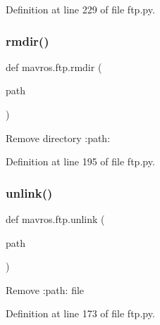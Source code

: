 Definition at line 229 of file ftp.\+py.

\mbox{\label{namespacemavros_1_1ftp_acb46c43e17c6e1a555fb30f0d39aff17}} 
\subsubsection{\texorpdfstring{rmdir()}{rmdir()}}
{\footnotesize\ttfamily def mavros.\+ftp.\+rmdir (\begin{DoxyParamCaption}\item[{}]{path }\end{DoxyParamCaption})}

\begin{DoxyVerb}Remove directory :path:\end{DoxyVerb}
 

Definition at line 195 of file ftp.\+py.

\mbox{\label{namespacemavros_1_1ftp_aa9c32cf7a3fca4b43a45ca103b9e5a7f}} 
\subsubsection{\texorpdfstring{unlink()}{unlink()}}
{\footnotesize\ttfamily def mavros.\+ftp.\+unlink (\begin{DoxyParamCaption}\item[{}]{path }\end{DoxyParamCaption})}

\begin{DoxyVerb}Remove :path: file\end{DoxyVerb}
 

Definition at line 173 of file ftp.\+py.

